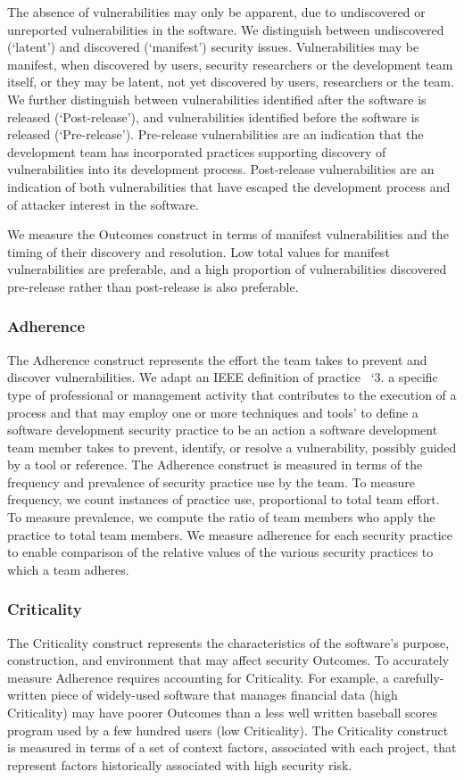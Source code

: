 The absence of vulnerabilities may only be apparent, due to undiscovered or unreported vulnerabilities in the software. We distinguish between undiscovered (`latent') and discovered (`manifest') security issues.  Vulnerabilities may be manifest, when discovered by users, security researchers or the development team itself, or they may be latent, not yet discovered by users, researchers or the team. We further distinguish between vulnerabilities identified after the software is released (`Post-release'), and vulnerabilities identified before the software is released (`Pre-release'). Pre-release vulnerabilities are an indication that the development team has incorporated practices supporting discovery of vulnerabilities into its development process. Post-release vulnerabilities are an indication of both vulnerabilities that have escaped the development process and of attacker interest in the software. 

We measure the Outcomes construct in terms of manifest vulnerabilities and the  timing of their discovery and resolution. Low total values for manifest vulnerabilities are preferable, and a high proportion of vulnerabilities discovered pre-release rather than post-release is also preferable. 

\subsubsection{Adherence}
The Adherence construct represents the effort the team takes to prevent and discover vulnerabilities. We adapt an IEEE definition of practice~\cite{ieee1990glossary} `3. a specific type of professional or management activity that contributes to 
the execution of a process and that may employ one or more techniques and tools' to define a software development security practice to be an action a software development team member takes to prevent, identify, or resolve a vulnerability, possibly guided by a tool or reference. The Adherence construct is measured in terms of the frequency and prevalence of security practice use by the team. To measure frequency, we count instances of practice use, proportional to total team effort. To measure prevalence, we compute the ratio of team members who apply the practice to total team members. We measure adherence for each security practice to enable comparison of the relative values of the various security practices to which a team adheres.

\subsubsection{Criticality}
The Criticality construct represents the characteristics of the software's purpose, construction, and environment that may affect security Outcomes. To accurately measure Adherence requires accounting for Criticality. For example, a carefully-written piece of widely-used software that manages financial data (high Criticality) may have poorer Outcomes than a less well written baseball scores program used by a few hundred users (low Criticality). The Criticality construct is measured in terms of a set of context factors, associated with each project, that represent factors historically associated with high security risk. 

